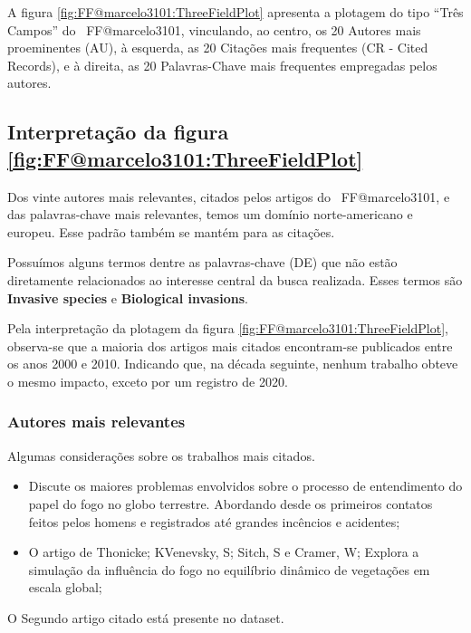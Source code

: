 A figura \ref{fig:FF@marcelo3101:ThreeFieldPlot} apresenta a plotagem do tipo ``Três Campos'' do \dataset\   FF@marcelo3101, vinculando, ao centro, os 20 Autores mais proeminentes (AU), à esquerda, as 20 Citações mais frequentes (CR - Cited Records), e à direita, as 20 Palavras-Chave mais frequentes empregadas pelos autores.

\subsection{Interpretação da figura \ref{fig:FF@marcelo3101:ThreeFieldPlot}}

Dos vinte autores mais relevantes, citados pelos artigos do \dataset\ FF@marcelo3101, e das palavras-chave mais relevantes, temos um domínio norte-americano e europeu. Esse padrão também se mantém para as citações.

Possuímos alguns termos dentre as palavras-chave (DE) que não estão diretamente relacionados ao interesse central da busca realizada. Esses termos são \textbf{Invasive species} e \textbf{Biological invasions}.

Pela interpretação da plotagem da figura \ref{fig:FF@marcelo3101:ThreeFieldPlot}, observa-se que a maioria dos artigos mais citados encontram-se publicados entre os anos 2000 e 2010. Indicando que, na década seguinte, nenhum trabalho obteve o mesmo impacto, exceto por um registro de 2020. 

\subsubsection{Autores mais relevantes\label{FF@marcelo3101:Sankey:AutoresRelevantes}}

Algumas considerações sobre os trabalhos mais citados.

\begin{itemize}
    \item  \cite{bowman_fire_2009} Discute os maiores problemas envolvidos sobre o processo de entendimento do papel do fogo no globo terrestre. Abordando desde os primeiros contatos feitos pelos homens e registrados até grandes incêncios e acidentes;
    \item  O artigo de Thonicke; KVenevsky, S; Sitch, S e Cramer, W; Explora a simulação da influência do fogo no equilíbrio dinâmico de vegetações em escala global;
\end{itemize}

O Segundo artigo citado está presente no dataset.

